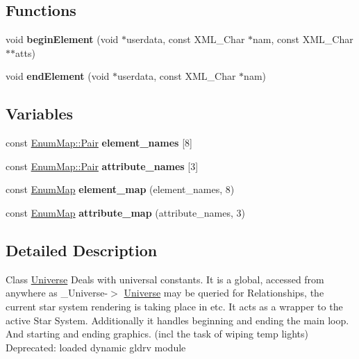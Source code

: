 \subsection*{Functions}
\begin{DoxyCompactItemize}
\item 
void {\bfseries begin\+Element} (void $\ast$userdata, const X\+M\+L\+\_\+\+Char $\ast$nam, const X\+M\+L\+\_\+\+Char $\ast$$\ast$atts)\hypertarget{namespaceGalaxyXML_aa527140c20cae1c23e17abe714f857ce}{}\label{namespaceGalaxyXML_aa527140c20cae1c23e17abe714f857ce}

\item 
void {\bfseries end\+Element} (void $\ast$userdata, const X\+M\+L\+\_\+\+Char $\ast$nam)\hypertarget{namespaceGalaxyXML_a7979206e086c90e60fb7e63bccaa57dd}{}\label{namespaceGalaxyXML_a7979206e086c90e60fb7e63bccaa57dd}

\end{DoxyCompactItemize}
\subsection*{Variables}
\begin{DoxyCompactItemize}
\item 
const \hyperlink{structXMLSupport_1_1EnumMap_1_1Pair}{Enum\+Map\+::\+Pair} {\bfseries element\+\_\+names} \mbox{[}8\mbox{]}
\item 
const \hyperlink{structXMLSupport_1_1EnumMap_1_1Pair}{Enum\+Map\+::\+Pair} {\bfseries attribute\+\_\+names} \mbox{[}3\mbox{]}
\item 
const \hyperlink{classXMLSupport_1_1EnumMap}{Enum\+Map} {\bfseries element\+\_\+map} (element\+\_\+names, 8)\hypertarget{namespaceGalaxyXML_a5693f207e9899508f02cfce82d47dda3}{}\label{namespaceGalaxyXML_a5693f207e9899508f02cfce82d47dda3}

\item 
const \hyperlink{classXMLSupport_1_1EnumMap}{Enum\+Map} {\bfseries attribute\+\_\+map} (attribute\+\_\+names, 3)\hypertarget{namespaceGalaxyXML_ad21e620d6511ff988a2b59360e771a31}{}\label{namespaceGalaxyXML_ad21e620d6511ff988a2b59360e771a31}

\end{DoxyCompactItemize}


\subsection{Detailed Description}
Class \hyperlink{classUniverse}{Universe} Deals with universal constants. It is a global, accessed from anywhere as \+\_\+\+Universe-\/$>$ \hyperlink{classUniverse}{Universe} may be queried for Relationships, the current star system rendering is taking place in etc. It acts as a wrapper to the active Star System. Additionally it handles beginning and ending the main loop. And starting and ending graphics. (incl the task of wiping temp lights) Deprecated\+: loaded dynamic gldrv module 

